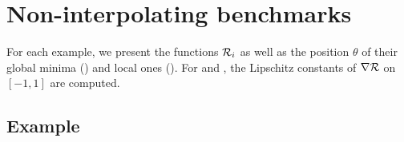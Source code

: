 \documentclass[article,authoryear,jmlmc]{beg_32}             %
\begin{document}
%
%		
%		
%		


\section{Non-interpolating benchmarks}
\label{annexe_non_interpolated}

For each example, we present the functions $\mathcal{R}_i$ as well as the position $\theta$ of their global minima (\mg) and local ones (\ml). For \exOne and \exTwo, the Lipschitz constants of $\nabla \mathcal{R}$ on $[-1,1]$ are computed.

\subsection{Example \exOne}
~~\\
\end{document}
